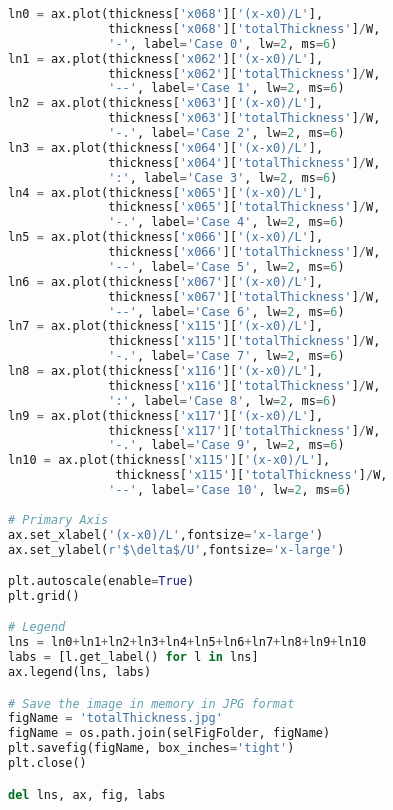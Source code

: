 \begin{lstlisting}[language=python]
ln0 = ax.plot(thickness['x068']['(x-x0)/L'],
              thickness['x068']['totalThickness']/W,
              '-', label='Case 0', lw=2, ms=6)
ln1 = ax.plot(thickness['x062']['(x-x0)/L'],
              thickness['x062']['totalThickness']/W,
              '--', label='Case 1', lw=2, ms=6)
ln2 = ax.plot(thickness['x063']['(x-x0)/L'],
              thickness['x063']['totalThickness']/W,
              '-.', label='Case 2', lw=2, ms=6)
ln3 = ax.plot(thickness['x064']['(x-x0)/L'],
              thickness['x064']['totalThickness']/W,
              ':', label='Case 3', lw=2, ms=6)
ln4 = ax.plot(thickness['x065']['(x-x0)/L'],
              thickness['x065']['totalThickness']/W,
              '-.', label='Case 4', lw=2, ms=6)
ln5 = ax.plot(thickness['x066']['(x-x0)/L'],
              thickness['x066']['totalThickness']/W,
              '--', label='Case 5', lw=2, ms=6)
ln6 = ax.plot(thickness['x067']['(x-x0)/L'],
              thickness['x067']['totalThickness']/W,
              '--', label='Case 6', lw=2, ms=6)
ln7 = ax.plot(thickness['x115']['(x-x0)/L'],
              thickness['x115']['totalThickness']/W,
              '-.', label='Case 7', lw=2, ms=6)
ln8 = ax.plot(thickness['x116']['(x-x0)/L'],
              thickness['x116']['totalThickness']/W,
              ':', label='Case 8', lw=2, ms=6)
ln9 = ax.plot(thickness['x117']['(x-x0)/L'],
              thickness['x117']['totalThickness']/W,
              '-.', label='Case 9', lw=2, ms=6)
ln10 = ax.plot(thickness['x115']['(x-x0)/L'],
               thickness['x115']['totalThickness']/W,
              '--', label='Case 10', lw=2, ms=6)
    
# Primary Axis
ax.set_xlabel('(x-x0)/L',fontsize='x-large')
ax.set_ylabel(r'$\delta$/U',fontsize='x-large')

plt.autoscale(enable=True)
plt.grid()

# Legend
lns = ln0+ln1+ln2+ln3+ln4+ln5+ln6+ln7+ln8+ln9+ln10
labs = [l.get_label() for l in lns]
ax.legend(lns, labs)

# Save the image in memory in JPG format
figName = 'totalThickness.jpg'
figName = os.path.join(selFigFolder, figName)
plt.savefig(figName, box_inches='tight')
plt.close()

del lns, ax, fig, labs

\end{lstlisting}
